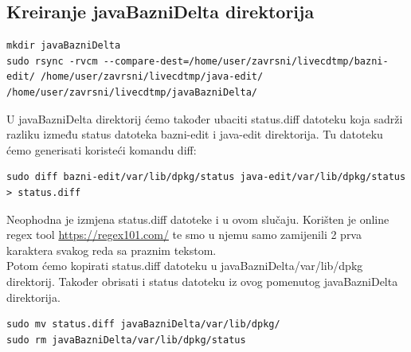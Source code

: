 \documentclass[12pt,vi]{mitthesis}
\begin{document}
\subsection*{Kreiranje javaBazniDelta direktorija}
\begin{lstlisting}[style=BashInputStyle]
mkdir javaBazniDelta
sudo rsync -rvcm --compare-dest=/home/user/zavrsni/livecdtmp/bazni-edit/ /home/user/zavrsni/livecdtmp/java-edit/ /home/user/zavrsni/livecdtmp/javaBazniDelta/
\end{lstlisting}
\indent
U javaBazniDelta direktorij ćemo također ubaciti status.diff datoteku koja sadrži razliku između status datoteka bazni-edit i java-edit direktorija. Tu datoteku ćemo generisati koristeći komandu diff:
\begin{lstlisting}[style=BashInputStyle]
sudo diff bazni-edit/var/lib/dpkg/status java-edit/var/lib/dpkg/status > status.diff
\end{lstlisting}
Neophodna je izmjena status.diff datoteke i u ovom slučaju.
Korišten je online regex tool \url{https://regex101.com/} te smo u njemu samo zamijenili 2 prva karaktera svakog reda sa praznim tekstom.\\
\indent
Potom ćemo kopirati status.diff datoteku u javaBazniDelta/var/lib/dpkg direktorij. Također obrisati i status datoteku iz ovog pomenutog javaBazniDelta direktorija.\\
\begin{lstlisting}[style=BashInputStyle]
sudo mv status.diff javaBazniDelta/var/lib/dpkg/
sudo rm javaBazniDelta/var/lib/dpkg/status
\end{lstlisting}
\end{document}
